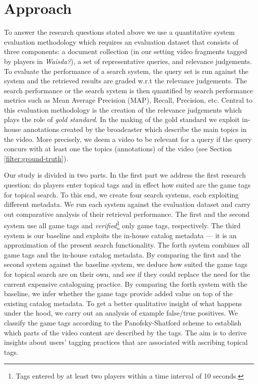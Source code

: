\section{Approach}\label{sec:topicir-filter:approach}
To answer the research questions stated above we use a quantitative system evaluation methodology \cite{vorhees} which requires an evaluation dataset that consists of three components: a document collection (in our setting video fragments tagged by players in \textit{Waisda?}), a set of representative queries, and relevance judgements. To evaluate the performance of a search system, the query set is run against the system and the retrieved results are graded w.r.t the relevance judgements. The search performance or the search system is then quantified by search performance metrics such as Mean Average Precision (MAP), Recall,
Precision, etc. Central to this evaluation methodology is the creation of the relevance judgements which plays the role of \textit{gold standard}. In the making of the gold standard we exploit in-house annotations created by the broadcaster which describe the main topics in the video. More precisely, we deem a video to be relevant for a query if the query concurs with at least one the topics (annotations) of the video (see Section \ref{filter:ground-truth}).

Our study is divided in two parts. In the first part we address the first research question: do players enter topical tags and in effect how suited are the game tags for topical search. To this end, we create four search systems, each exploiting different metadata. We run each system against the evaluation dataset and carry out comparative analysis of their retrieval performance. The first and the second system use all game tags and \textit{verified}\footnote{Tags entered by at least two players within a time interval of 10 seconds.} only game tags, respectively. The third system is our baseline and exploits the in-house catalog metadata --- it is an approximation of the present search functionality. The forth system combines all game tags and the in-house catalog metadata. By comparing the first and the second system against the baseline system, we deduce how suited the game tags for topical search are on their own, and see if they could replace the need for the current expensive cataloguing practice. By comparing the forth system with the baseline, we infer whether the game tags provide added value on top of the existing catalog metadata. 
To get a better qualitative insight of what happens under the hood, we carry out an analysis of example false/true positives. We classify the game tags according to the Panofsky-Shatford scheme to establish which parts of the video content are described by the tags. The aim is to derive insights about users' tagging practices that are associated with ascribing topical tags. 


